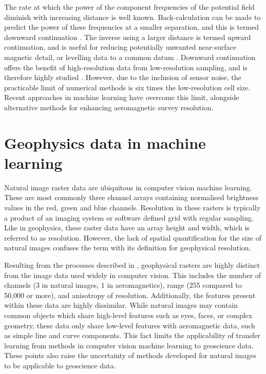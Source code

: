 \documentclass[manuscript.tex]{subfiles}
\begin{document}
The rate at which the power of the component frequencies of the potential field diminish with increasing distance is well known.
Back-calculation can be made to predict the power of these frequencies at a smaller separation, and this is termed downward continuation \textcite{bullardDeterminationMassesNecessary1948,blakelyPotentialTheoryGravity1996}.
The inverse using a larger distance is termed upward continuation, and is useful for reducing potentially unwanted near-surface magnetic detail, or levelling data to a common datum \parencite[e.g.\ open file magnetic data in Australia is available levelled to the AWAGS datum][]{mintyAirborneGeophysicalMapping2011}.
Downward continuation offers the benefit of high-resolution data from low-resolution sampling, and is therefore highly studied \parencite{zuoDownwardContinuationTransformation2020,liStableDownwardContinuation2023,fediStableDownwardContinuation2002,yeHighprecisionDownwardContinuation2022,zhangNumericalSolutionsMeanValue2018,guoPotentialFieldContinuation2020,gangImprovedStableDownward2018,pilkingtonPotentialFieldContinuation2017}.
However, due to the inclusion of sensor noise, the practicable limit of numerical methods is six times the low-resolution cell size.
Recent approaches in machine learning have overcome this limit, alongside alternative methods for enhancing aeromagnetic survey resolution.

\section{Geophysics data in machine learning}
\label{sec:introdata}
Natural image raster data are ubiquitous in computer vision machine learning.
These are most commonly three channel arrays containing normalised brightness values in the red, green and blue channels.
Resolution in these rasters is typically a product of an imaging system or software defined grid with regular sampling.
Like in geophysics, these raster data have an array height and width, which is referred to as resolution.
However, the lack of spatial quantification for the size of natural images confuses the term with its definition for geophysical resolution.

Resulting from the processes described in , geophysical rasters are highly distinct from the image data used widely in computer vision.
This includes the number of channels (3 in natural images, 1 in aeromagnetics), range (255 compared to 50,000 or more), and anisotropy of resolution.
Additionally, the features present within these data are highly dissimilar.
While natural images may contain common objects which share high-level features such as eyes, faces, or complex geometry, these data only share low-level features with aeromagnetic data, such as simple line and curve components.
This fact limits the applicability of transfer learning from methods in computer vision machine learning \parencite{tanSurveyDeepTransfer2018} to geoscience data.
These points also raise the uncertainty of methods developed for natural images to be  applicable to geoscience data.
\end{document}
